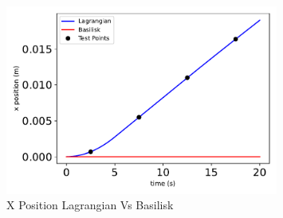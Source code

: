\begin{figure}[htbp]\centerline{\includegraphics[width=0.8\textwidth]{AutoTeX/XPositionLagrangianVsBasilisk}}\caption{X Position Lagrangian Vs Basilisk}\label{fig:XPositionLagrangianVsBasilisk}\end{figure}
